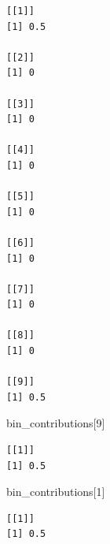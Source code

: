 \documentclass[
  letterpaper,
  DIV=11,
  numbers=noendperiod]{scrreprt}
\newenvironment{Shaded}{\begin{snugshade}}{\end{snugshade}}
\newcommand{\DecValTok}[1]{\textcolor[rgb]{0.68,0.00,0.00}{#1}}
\newcommand{\NormalTok}[1]{\textcolor[rgb]{0.00,0.23,0.31}{#1}}
\begin{document}
\begin{verbatim}
[[1]]
[1] 0.5

[[2]]
[1] 0

[[3]]
[1] 0

[[4]]
[1] 0

[[5]]
[1] 0

[[6]]
[1] 0

[[7]]
[1] 0

[[8]]
[1] 0

[[9]]
[1] 0.5
\end{verbatim}

\begin{Shaded}
\begin{Highlighting}[]
\NormalTok{bin\_contributions[}\DecValTok{9}\NormalTok{]}
\end{Highlighting}
\end{Shaded}

\begin{verbatim}
[[1]]
[1] 0.5
\end{verbatim}

\begin{Shaded}
\begin{Highlighting}[]
\NormalTok{bin\_contributions[}\DecValTok{1}\NormalTok{]}
\end{Highlighting}
\end{Shaded}

\begin{verbatim}
[[1]]
[1] 0.5
\end{verbatim}
\end{document}

